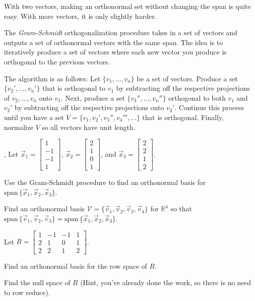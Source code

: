 \documentclass[letter]{article}
\newcommand{\R}{\mathbb{R}}
\renewcommand{\span}{\mathrm{span}\,}
\newcommand{\mat}[1]{\begin{bmatrix}#1\end{bmatrix}}
\begin{document}
	With two vectors, making an orthonormal set without changing the span
	is quite easy.  With more vectors, it is only slightly harder.

	\begin{Def}
		The \emph{Gram-Schmidt} orthogonalization procedure
		takes in a set of vectors and outputs a set of orthonormal vectors
		with the same span.  The idea is to iteratively produce a set of
		vectors where each new vector you produce is orthogonal to the previous vectors.

		The algorithm is as follows: Let $\{ v_1,\ldots, v_n\}$ be a set of 
		vectors.  Produce a set $\{ v_2',\ldots, v_n'\}$ that is orthogonal
		to $ v_1$ by subtracting off the respective projections
		of $ v_2,\ldots, v_n$
		onto $ v_1$.  Next, produce a set $\{ v_3'',\ldots, v_n''\}$
		orthogonal to both $ v_1$ and $ v_2'$ by subtracting off the
		respective projections
		onto $ v_2'$.  Continue this process until you have a set
		$V=\{ v_1, v_2', v_3'', v_4''',\ldots\}$ that is orthogonal.
		Finally, normalize $V$ so all vectors have unit length.
	\end{Def}

	\sep
	Let $\vec x_1=\mat{1\\-1\\-1\\1}$, $\vec x_2=\mat{2\\1\\0\\1}$, and 
	$\vec x_3=\mat{2\\2\\1\\2}$.
	\begin{Enum}
		\item Use the Gram-Schmidt procedure to find an orthonormal basis for 
			$\span\{\vec x_1,\vec x_2,\vec x_3\}$.
		\item Find an orthonormal basis $\mathcal V=\{\vec v_1,\vec v_2,\vec v_3,\vec v_4\}$
			for $\R^4$ so that $\span\{\vec v_1,\vec v_2,\vec v_3\}=
			\span\{\vec x_1,\vec x_2,\vec x_3\}$.
	\end{Enum}
	Let $R=\mat{1&-1&-1&1\\2&1&0&1\\2&2&1&2}$.
	\begin{Enum}[resume]
		\item Find an orthonormal basis for the row space of $R$.
		\item Find the null space of $R$ (Hint, you've already done the work, so
			there is no need to row reduce).
	\end{Enum}
\end{document}
